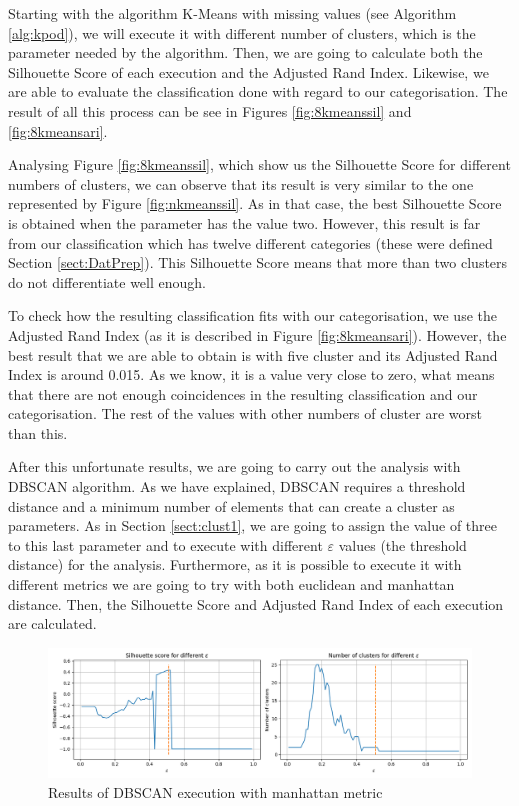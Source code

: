 Starting with the algorithm K-Means with missing values (see Algorithm \ref{alg:kpod}), we will execute it with different number of clusters, which is the parameter needed by the algorithm. Then, we are going to calculate both the Silhouette Score of each execution and the Adjusted Rand Index. Likewise, we are able to evaluate the classification done with regard to our categorisation. The result of all this process can be see in Figures \ref{fig:8kmeanssil} and \ref{fig:8kmeansari}.

Analysing Figure \ref{fig:8kmeanssil}, which show us the Silhouette Score for different numbers of clusters, we can observe that its result is very similar to the one represented by Figure \ref{fig:nkmeanssil}. As in that case, the best Silhouette Score is obtained when the parameter has the value two. However, this result is far from our classification which has twelve different categories (these were defined Section \ref{sect:DatPrep}). This Silhouette Score means that more than two clusters do not differentiate well enough.

To check how the resulting classification fits with our categorisation, we use the Adjusted Rand Index (as it is described in Figure \ref{fig:8kmeansari}). However, the best result that we are able to obtain is with five cluster and its Adjusted Rand Index is around 0.015. As we know, it is a value very close to zero, what means that there are not enough coincidences in the resulting classification and our categorisation. The rest of the values with other numbers of cluster are worst than this.

After this unfortunate results, we are going to carry out the analysis with DBSCAN algorithm. As we have explained, DBSCAN requires a threshold distance and a minimum number of elements that can create a cluster as parameters. As in Section \ref{sect:clust1}, we are going to assign the value of three to this last parameter and to execute with different $\varepsilon$ values (the threshold distance) for the analysis. Furthermore, as it is possible to execute it with different metrics we are going to try with both euclidean and manhattan distance. Then, the Silhouette Score and Adjusted Rand Index of each execution are calculated.

\begin{figure}
	\centering%
	\centerline{\includegraphics[width=\textwidth]{Imagenes/Bitmap/Clustering/dbscan8sil.png}}%
	\caption{Results of DBSCAN execution with manhattan metric}%
	\label{fig:dbscanman}
\end{figure}

